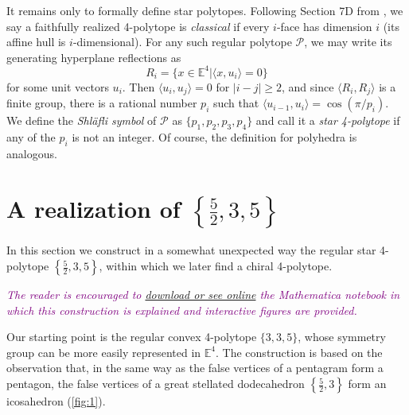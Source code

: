\documentclass{article}
\theoremstyle{definition}
\newcommand{\E}{\mathbb{E}}
\newcommand{\p}{\mathcal{P}}
\begin{document}
	\vspace{.5cm}
	
	It remains only to formally define star polytopes. Following Section 7D from \cite{abstract-polytopes}, we say a faithfully realized 4-polytope is \textit{classical} if every $i$-face has dimension $i$ (its affine hull is $i$-dimensional). For any such regular polytope $\p$, we may write its generating hyperplane reflections as
	\[R_i=\{x\in\E^4|\langle x,u_i\rangle=0\}\]
	for some unit vectors $u_i$. Then $\langle u_i,u_j\rangle=0$ for $|i-j|\geq2$, and since $\langle R_i,R_j\rangle$ is a finite group, there is a rational number $p_i$ such that $\langle u_{i-1},u_i\rangle=\cos(\pi/p_i)$. We define the \textit{Shläfli symbol} of $\p$ as $\{p_1,p_2,p_3,p_4\}$ and call it a \textit{star 4-polytope} if any of the $p_i$ is not an integer. Of course, the definition for polyhedra is analogous.

	\section{A realization of $\left\{\frac{5}{2},3,5\right\}$}
	In this section we construct in a somewhat unexpected way the regular star 4-polytope $\left\{\frac{5}{2},3,5\right\}$, within which we later find a chiral 4-polytope.
	
	\textcolor{purple}{\textit{The reader is encouraged to \href{https://www.wolframcloud.com/obj/dangcasanova/Published/chiral-4polytope.nb}{download or see online} the Mathematica notebook in which this construction is explained and interactive figures are provided.}}
	
	Our starting point is the regular convex 4-polytope $\{3,3,5\}$, whose symmetry group can be more easily represented in $\E^4$. The construction is based on the observation that, in the same way as the false vertices of a pentagram form a pentagon, the false vertices of a great stellated dodecahedron $\left\{\frac{5}{2},3\right\}$ form an icosahedron (\cref{fig:1}).
	
\end{document}
